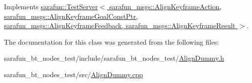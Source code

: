 Implements \hyperlink{classsarafun_1_1TestServer_a85b9721105c2a4b46bae26428433513e}{sarafun\-::\-Test\-Server$<$ sarafun\-\_\-msgs\-::\-Align\-Keyframe\-Action, sarafun\-\_\-msgs\-::\-Align\-Keyframe\-Goal\-Const\-Ptr, sarafun\-\_\-msgs\-::\-Align\-Keyframe\-Feedback, sarafun\-\_\-msgs\-::\-Align\-Keyframe\-Result $>$}.



The documentation for this class was generated from the following files\-:\begin{DoxyCompactItemize}
\item 
sarafun\-\_\-bt\-\_\-nodes\-\_\-test/include/sarafun\-\_\-bt\-\_\-nodes\-\_\-test/\hyperlink{AlignDummy_8h}{Align\-Dummy.\-h}\item 
sarafun\-\_\-bt\-\_\-nodes\-\_\-test/src/\hyperlink{AlignDummy_8cpp}{Align\-Dummy.\-cpp}\end{DoxyCompactItemize}
